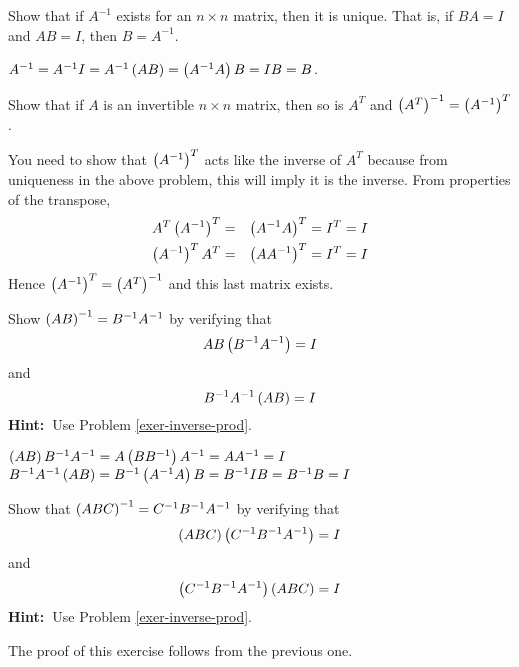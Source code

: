 \begin{enumialphparenastyle}
\begin{ex}\label{exer-inverse-prod}Show that if $A^{-1}$ exists for an $n\times n$
matrix, then it is unique. That is, if $BA=I$ and $AB=I$, then $B=A^{-1}$. 
\begin{sol}
 $A^{-1}=A^{-1}I=A^{-1}\left(AB\right) =\left(A^{-1}A\right) B=IB=B$.
\end{sol}
\end{ex}

\begin{ex}Show that if $A$ is an invertible $n\times n$ matrix, then so is 
$A^{T} $ and $\left(A^{T}\right) ^{-1}=\left(A^{-1}\right) ^{T}$. 
\begin{sol}
 You need to show that $\left(A^{-1}\right) ^{T}$ acts like the inverse of $A^{T}
$ because from uniqueness in the above problem, this will imply it is the
inverse. From properties of the transpose,
\begin{eqnarray*}
A^{T}\left(A^{-1}\right) ^{T} &=&\left(A^{-1}A\right) ^{T}=I^{T}=I \\
\left(A^{-1}\right) ^{T}A^{T} &=&\left(AA^{-1}\right) ^{T}=I^{T}=I
\end{eqnarray*}
Hence $\left(A^{-1}\right) ^{T}=\left(A^{T}\right) ^{-1}$ and this last
matrix exists.
\end{sol}
\end{ex}

\begin{ex}Show $\left(AB\right) ^{-1}=B^{-1}A^{-1}$ by verifying that 
\begin{equation*}
AB\left(
B^{-1}A^{-1}\right) =I
\end{equation*} and 
\begin{equation*}
B^{-1}A^{-1}\left(AB\right) =I
\end{equation*}
\textbf{Hint:\ }Use Problem \ref{exer-inverse-prod}.
\begin{sol}
$\left(AB\right)
B^{-1}A^{-1}=A\left(BB^{-1}\right) A^{-1}=AA^{-1}=I$ $B^{-1}A^{-1}\left(
AB\right) =B^{-1}\left(A^{-1}A\right) B=B^{-1}IB=B^{-1}B=I$
\end{sol}
\end{ex}

\begin{ex}Show that $\left(ABC\right) ^{-1}=C^{-1}B^{-1}A^{-1}$ by verifying
that 
\[
\left(ABC\right) \left(C^{-1}B^{-1}A^{-1}\right) =I
\]
and 
\[\left(C^{-1}B^{-1}A^{-1}\right)\left(ABC\right) =I
\] 
\textbf{Hint:\ }Use Problem \ref{exer-inverse-prod}. 
\begin{sol}
The proof of this exercise follows from the previous one.
\end{sol}
\end{ex}


\end{enumialphparenastyle}
